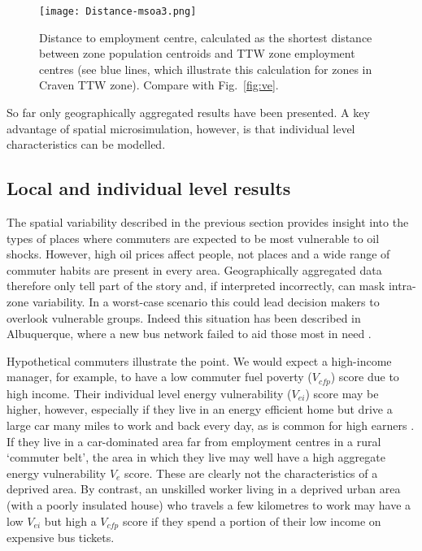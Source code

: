 \begin{figure}[h]
 \centering
   \texttt{[image: Distance-msoa3.png]}
 \caption[Distance to employment centre from zone centroids]{Distance to
employment centre, calculated as the shortest distance
between zone population centroids and TTW zone employment centres (see
blue lines, which illustrate this calculation for zones in Craven TTW zone).
 Compare with Fig.~\ref{fig:ve}.}
 \label{fig:mapttw}
\end{figure}

So far only geographically aggregated results have been presented.
A key advantage of spatial microsimulation, however, is that individual level
characteristics can be modelled.

\subsection{Local and individual level results}
\label{s:indresults}
The spatial variability described in the previous section
provides insight into the types of places
where commuters are expected to be most vulnerable to oil shocks.
However, high oil prices affect people, not places and a wide range of
commuter habits are present in every area. Geographically
aggregated data therefore only tell part of the story and, if
interpreted incorrectly, can mask intra-zone variability.
In a worst-case scenario this could lead decision makers to
overlook vulnerable groups. Indeed this situation has been described
in Albuquerque, where a new bus network failed to
aid those most in need \citep{Tribby2012}.

Hypothetical commuters illustrate the point. We would expect a
high-income manager, for example, to have a low commuter fuel poverty
($V_{cfp}$)
score due to high income. Their individual level energy vulnerability ($V_{ei}$)
score may be higher, however,
especially if they live in an energy efficient home but drive a large car
many miles to work and back every day, as is common for high earners
\citep{Green-1999-ld-commute}. If they live in a car-dominated area far from
employment centres in a rural `commuter belt', the area in which they live
may well have a high aggregate energy vulnerability $V_e$ score. These
are clearly not the characteristics of a deprived area.
By contrast, an unskilled worker living in a deprived urban area (with a poorly
insulated house) who travels a few kilometres to work may have a low
$V_{ei}$ but high a $V_{cfp}$ score if they spend
a portion of their low income on expensive bus tickets.

